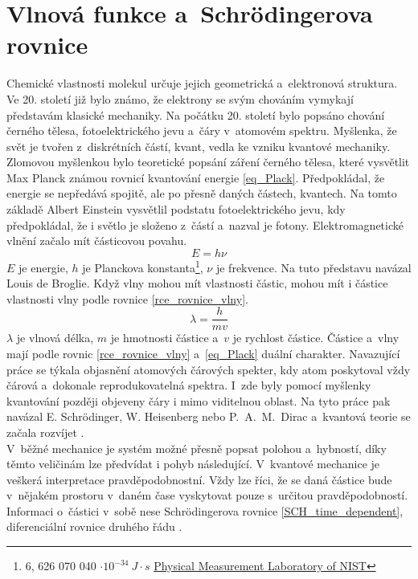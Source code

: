 \documentclass[
  printed, %
  table,   %
  lof,     %
  lot,     %
  oneside,
]{fithesis3}
\begin{document}
\section{Vlnová funkce a~Schrödingerova rovnice}
Chemické vlastnosti molekul určuje jejich geometrická a~elektronová struktura. Ve 20. století již bylo známo, že elektrony se svým chováním vymykají představám klasické mechaniky. Na počátku 20. století bylo popsáno chování černého tělesa, fotoelektrického jevu a~čáry v~atomovém spektru. Myšlenka, že svět je tvořen z~diskrétních částí, kvant, vedla ke vzniku kvantové mechaniky. Zlomovou myšlenkou bylo teoretické popsání záření černého tělesa, které vysvětlit Max Planck známou rovnicí kvantování energie \ref{eq_Plack}. Předpokládal, že energie se nepředává spojitě, ale po přesně daných částech, kvantech. Na tomto základě Albert Einstein vysvětlil podstatu fotoelektrického jevu, kdy předpokládal, že i světlo je složeno z~částí a~nazval je fotony. Elektromagnetické vlnění začalo mít částicovou povahu.
\begin{equation}
E = h \nu
\label{eq_Plack}
\end{equation}
$E$ je energie, $h$  je Planckova konstanta\footnote{6, 626 070 040  $\cdot 10^{-34} ~ J \cdot s$ \href{http://physics.nist.gov/cgi-bin/cuu/Value?h}{ Physical Measurement Laboratory of NIST}  }, $\nu$ je frekvence. Na tuto představu navázal Louis de Broglie. Když vlny mohou mít vlastnosti částic, mohou mít i částice vlastnosti vlny podle rovnice \ref{rce_rovnice_vlny}.
\begin{equation}
\lambda = \frac{h}{mv}
\label{rce_rovnice_vlny}
\end{equation}
$\lambda$ je vlnová délka, $m$ je hmotnosti částice a~$v$ je rychlost částice. Částice a~vlny mají podle rovnic \ref{rce_rovnice_vlny} a~\ref{eq_Plack} duální charakter. Navazující práce se týkala objasnění atomových čárových spekter, kdy atom poskytoval vždy čárová a~dokonale reprodukovatelná spektra. I~zde byly pomocí myšlenky kvantování později objeveny čáry i mimo viditelnou oblast. Na tyto práce pak navázal E. Schrödinger, W. Heisenberg nebo P.~A.~M.~Dirac a~kvantová teorie se začala rozvíjet \cite{celyprincipy}.\\
V~běžné mechanice je systém možné přesně popsat polohou a~hybností, díky těmto veličinám lze předvídat i pohyb následující. V~kvantové mechanice je veškerá interpretace pravděpodobnostní. Vždy lze říci, že se daná částice bude v~nějakém prostoru v~daném čase vyskytovat pouze s~určitou pravděpodobností. Informaci o~částici v~sobě nese Schrödingerova rovnice \ref{SCH_time_dependent}, diferenciální rovnice druhého řádu \cite{polak2000obecna}.
\end{document}
